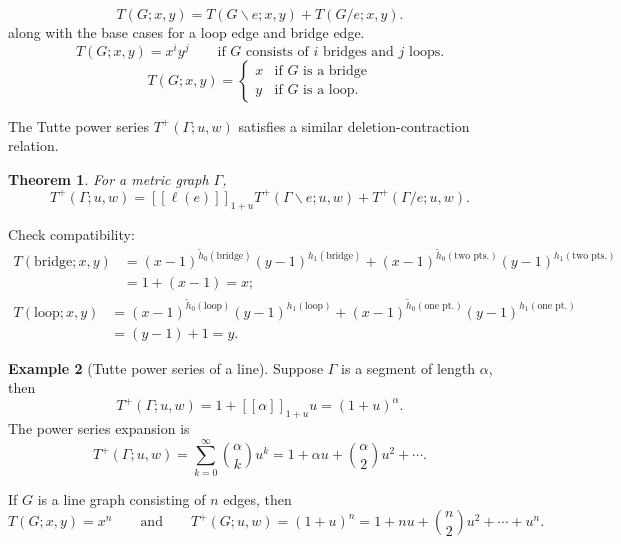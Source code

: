 \documentclass{amsart}
\newtheorem{thm}{Theorem}
\theoremstyle{definition}
\newtheorem{eg}[thm]{Example}
\newcommand{\fanalog}[2]{[\![#2]\!]_{#1}}
\begin{document}
\begin{equation*}
T(G;x,y) = T(G \backslash e; x,y) + T(G / e; x,y).
\end{equation*}
along with the base cases for a loop edge and bridge edge.
\begin{equation*}
T(G; x,y) = x^i y^j \qquad\text{if $G$ consists of $i$ bridges and $j$ loops.}
\end{equation*}
\begin{equation*}
T(G;x,y) = \begin{cases}
x & \text{if $G$ is a bridge} \\
y & \text{if $G$ is a loop}.
\end{cases}
\end{equation*}

The Tutte power series $T^+(\Gamma; u,w)$ satisfies a similar deletion-contraction relation.

\begin{thm}
For a metric graph $\Gamma$,
\begin{equation}
T^+(\Gamma; u,w) = \fanalog{1 + u}{\ell(e)} T^+(\Gamma \backslash e; u,w) + T^+(\Gamma / e; u,w) .
\end{equation}
\end{thm}

Check compatibility:
\begin{align*}
T(\text{bridge}; x,y) 
&= (x-1)^{\tilde h_0(\text{bridge}) }(y-1)^{h_1(\text{bridge} )} 
+ (x-1)^{\tilde h_0(\text{two pts.}) }(y-1)^{h_1(\text{two pts.})}  \\
&= 1 + (x-1) = x ;
\end{align*}
\begin{align*}
T(\text{loop}; x,y) 
&= (x-1)^{\tilde h_0(\text{loop}) }(y-1)^{h_1(\text{loop} )} 
+ (x-1)^{\tilde h_0(\text{one pt.}) }(y-1)^{h_1(\text{one pt.})} \\
&= (y-1) + 1 = y .
\end{align*}

\begin{eg}[Tutte power series of a line]
Suppose $\Gamma$ is a segment of length $\alpha$,
then
\[
T^+(\Gamma;u,w) 
= 1 + \fanalog{1 + u}{\alpha} u
= (1+u)^\alpha.
\]
The power series expansion is
$$
T^+(\Gamma;u,w) = \sum_{k=0}^\infty \binom{\alpha}{k} u^k
= 1 + \alpha u + \binom{\alpha}{2}u^2 + \cdots .
$$

If $G$ is a line graph consisting of $n$ edges,
then
$$
T(G;x,y) = x^n 
\qquad\text{and}\qquad 
T^+(G;u,w) = (1+u)^n = 1 + nu + \binom{n}{2}u^2 + \cdots + u^n.
$$
\end{eg}
\end{document}

